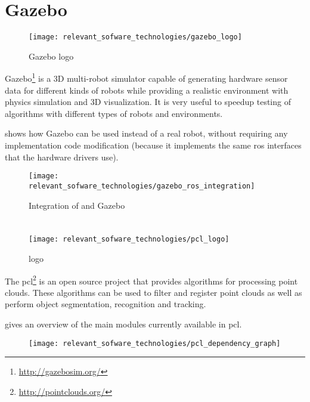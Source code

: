\section{Gazebo}

\begin{wrapfigure}{r}{0.25\textwidth}
	\centering
	\texttt{[image: relevant\_sofware\_technologies/gazebo\_logo]}
	\caption{Gazebo logo}
	\label{fig:relevant-sofware-technologies_gazebo-logo}
\end{wrapfigure}


Gazebo\footnote{\url{http://gazebosim.org/}} is a 3D multi-robot simulator capable of generating hardware sensor data for different kinds of robots while providing a realistic environment with physics simulation and 3D visualization. It is very useful to speedup testing of algorithms with different types of robots and environments.

 shows how Gazebo can be used instead of a real robot, without requiring any implementation code modification (because it implements the same \gls{ros} interfaces that the hardware drivers use).

\begin{figure}[ht]
	\centering
	\texttt{[image: relevant\_sofware\_technologies/gazebo\_ros\_integration]}
	\caption[Integration of  and Gazebo]{Integration of  and Gazebo\protect\footnotemark}
	\label{fig:relevant-sofware-technologies_gazebo-ros-integration}
\end{figure}



\section{}

\begin{wrapfigure}{r}{0.25\textwidth}
	\centering
	\texttt{[image: relevant\_sofware\_technologies/pcl\_logo]}
	\caption{ logo}
	\label{fig:relevant-sofware-technologies_pcl-logo}
\end{wrapfigure}

The \gls{pcl}\footnote{\url{http://pointclouds.org/}} \cite{Rusu2011} is an open source project that provides algorithms for processing point clouds. These algorithms can be used to filter and register point clouds as well as perform object segmentation, recognition and tracking.

 gives an overview of the main modules currently available in \gls{pcl}.

\begin{figure}[ht]
	\centering
	\texttt{[image: relevant\_sofware\_technologies/pcl\_dependency\_graph]}
	\caption[]{\protect\footnotemark}
	\label{fig:relevant-sofware-technologies_pcl-dependency-graph}
\end{figure}
